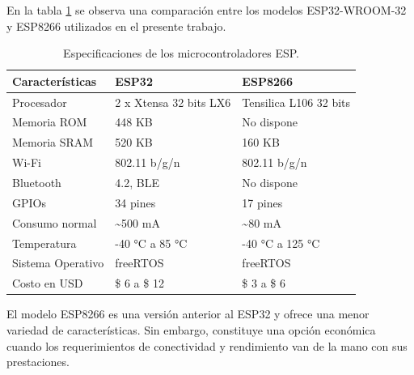 En la tabla \ref{tab:esp} se observa una comparación entre los modelos ESP32-WROOM-32 y ESP8266 utilizados en el presente trabajo.




\begin{table}[h]
\centering
\caption[Especificaciones de los microcontroladores ESP.]{Especificaciones de los microcontroladores ESP.}

\begin{tabular} {p{4cm} p{4cm} p{4cm}} 
\toprule
\textbf{Características} & \textbf{ESP32} & \textbf{ESP8266} \\
\midrule
Procesador		& 2 x Xtensa 32 bits LX6	& Tensilica L106 32 bits\\
Memoria ROM	 	& 448 KB	& No dispone\\	
Memoria SRAM	& 520 KB	& 160 KB\\
Wi-Fi			& 802.11 b/g/n & 802.11 b/g/n\\
Bluetooth		& 4.2, BLE & No dispone\\
GPIOs			& 34 pines & 17 pines\\
Consumo normal	& \textasciitilde 500 mA & \textasciitilde 80 mA \\
Temperatura		& -40 °C a 85 °C & -40 °C a 125 °C \\
Sistema Operativo &	freeRTOS	& freeRTOS \\
Costo en USD	& \$ 6 a \$ 12  & \$ 3 a  \$ 6 \\
\bottomrule
\hline
\end{tabular}
\label{tab:esp}
\end{table}

El modelo ESP8266 es una versión anterior al ESP32 y ofrece una menor variedad de características. Sin embargo, constituye una opción económica cuando los requerimientos de conectividad y rendimiento van de la mano con sus prestaciones.

 


